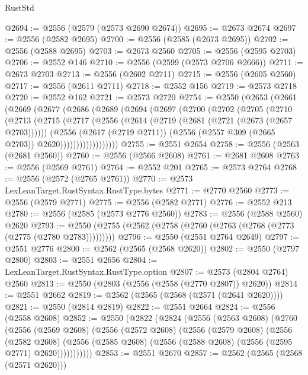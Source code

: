 \begin{lexlean}{RustStd}
\begin{coremodule}
@2694 := @2556 (@2579 (@2573 @2690 @2674))
@2695 := @2673 @2674
@2697 := @2556 (@2582 @2695)
@2700 := @2556 (@2585 (@2673 @2695))
@2702 := @2556 (@2588 @2695)
@2703 := @2673 @2560
@2705 := @2556 (@2595 @2703)
@2706 := @2552 @146
@2710 := @2556 (@2599 (@2573 @2706 @2666))
@2711 := @2673 @2703
@2713 := @2556 (@2602 @2711)
@2715 := @2556 (@2605 @2560)
@2717 := @2556 (@2611 @2711)
@2718 := @2552 @156
@2719 := @2573 @2718
@2720 := @2552 @162
@2721 := @2573 @2720
@2754 := @2550
    (@2653
      (@2661
        (@2669
          (@2677
            (@2686
              (@2689
                (@2694
                  (@2697
                    (@2700
                      (@2702
                        (@2705
                          (@2710
                            (@2713
                              (@2715
                                (@2717
                                  (@2556
                                    (@2614 (@2719 (@2681 (@2721 (@2673 (@2657 @2703))))))
                                    (@2556
                                      (@2617 (@2719 @2711))
                                      (@2556 (@2557 @309 (@2665 @2703)) @2620))))))))))))))))))
@2755 := @2551 @2654
@2758 := @2556 (@2563 (@2681 @2560))
@2760 := @2556 (@2566 @2608)
@2761 := @2681 @2608
@2763 := @2556 (@2569 @2761)
@2764 := @2552 @201
@2765 := @2573 @2764
@2768 := @2556 (@2572 (@2765 @2761))
@2770 := @2573 LexLeanTarget.RustSyntax.RustType.bytes
@2771 := @2770 @2560
@2773 := @2556 (@2579 @2771)
@2775 := @2556 (@2582 @2771)
@2776 := @2552 @213
@2780 := @2556 (@2585 (@2573 @2776 @2560))
@2783 := @2556 (@2588 @2560) @2620
@2793 := @2550 (@2755 (@2562 (@2758 (@2760 (@2763 (@2768 (@2773 (@2775 (@2780 @2783)))))))))
@2796 := @2550 (@2551 @2764 @2649)
@2797 := @2551 @2776
@2800 := @2562 (@2565 (@2568 @2620))
@2802 := @2550 (@2797 @2800)
@2803 := @2551 @2656
@2804 := LexLeanTarget.RustSyntax.RustType.option
@2807 := @2573 (@2804 @2764) @2560
@2813 := @2550 (@2803 (@2556 (@2558 (@2770 @2807)) @2620))
@2814 := @2551 @2662
@2819 := @2562 (@2565 (@2568 (@2571 (@2641 @2620))))
@2821 := @2550 (@2814 @2819)
@2822 := @2551 @2664
@2824 := @2556 (@2558 @2608)
@2852 := @2550
    (@2822
      (@2824
        (@2556
          (@2563 @2608)
          (@2760
            (@2556
              (@2569 @2608)
              (@2556
                (@2572 @2608)
                (@2556
                  (@2579 @2608)
                  (@2556
                    (@2582 @2608)
                    (@2556 (@2585 @2608) (@2556 (@2588 @2608) (@2556 (@2595 @2771) @2620)))))))))))
@2853 := @2551 @2670
@2857 := @2562 (@2565 (@2568 (@2571 @2620)))

\end{coremodule}
\end{lexlean}
